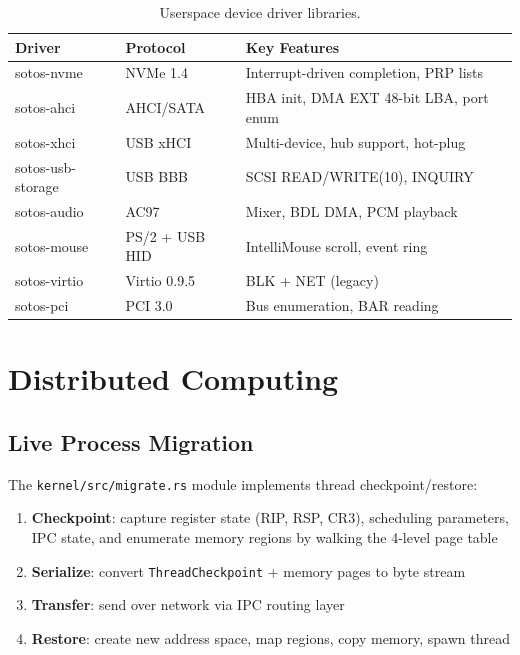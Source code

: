 \documentclass[11pt,letterpaper]{article}
\theoremstyle{definition}
\begin{document}
\begin{table}[h]
\centering
\begin{tabular}{lll}
\toprule
\textbf{Driver} & \textbf{Protocol} & \textbf{Key Features} \\
\midrule
sotos-nvme & NVMe 1.4 & Interrupt-driven completion, PRP lists \\
sotos-ahci & AHCI/SATA & HBA init, DMA EXT 48-bit LBA, port enum \\
sotos-xhci & USB xHCI & Multi-device, hub support, hot-plug \\
sotos-usb-storage & USB BBB & SCSI READ/WRITE(10), INQUIRY \\
sotos-audio & AC97 & Mixer, BDL DMA, PCM playback \\
sotos-mouse & PS/2 + USB HID & IntelliMouse scroll, event ring \\
sotos-virtio & Virtio 0.9.5 & BLK + NET (legacy) \\
sotos-pci & PCI 3.0 & Bus enumeration, BAR reading \\
\bottomrule
\end{tabular}
\caption{Userspace device driver libraries.}
\end{table}

\section{Distributed Computing}
\label{sec:distributed}

\subsection{Live Process Migration}

The \texttt{kernel/src/migrate.rs} module implements thread checkpoint/restore:

\begin{enumerate}[nosep]
    \item \textbf{Checkpoint}: capture register state (RIP, RSP, CR3), scheduling parameters,
          IPC state, and enumerate memory regions by walking the 4-level page table
    \item \textbf{Serialize}: convert \texttt{ThreadCheckpoint} + memory pages to byte stream
    \item \textbf{Transfer}: send over network via IPC routing layer
    \item \textbf{Restore}: create new address space, map regions, copy memory, spawn thread
\end{enumerate}
\end{document}

